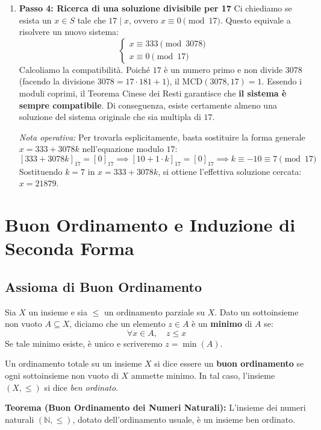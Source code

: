 \documentclass[12pt, a4paper]{article}
\begin{document}
\begin{enumerate}
    \item \textbf{Passo 4: Ricerca di una soluzione divisibile per 17}
    Ci chiediamo se esista un $x \in S$ tale che $17 \mid x$, ovvero $x \equiv 0 \pmod{17}$.
    Questo equivale a risolvere un nuovo sistema:
    \[
    \begin{cases}
        x \equiv 333 \pmod{3078} \\
        x \equiv 0 \pmod{17}
    \end{cases}
    \]
    Calcoliamo la compatibilità. Poiché $17$ è un numero primo e non divide $3078$ (facendo la divisione $3078 = 17 \cdot 181 + 1$), il $\text{MCD}(3078, 17) = 1$.
    Essendo i moduli coprimi, il Teorema Cinese dei Resti garantisce che \textbf{il sistema è sempre compatibile}. Di conseguenza, esiste certamente almeno una soluzione del sistema originale che sia multipla di $17$.
    
    \emph{Nota operativa:} Per trovarla esplicitamente, basta sostituire la forma generale $x = 333 + 3078k$ nell'equazione modulo $17$:
    \[ [333 + 3078k]_{17} = [0]_{17} \implies [10 + 1 \cdot k]_{17} = [0]_{17} \implies k \equiv -10 \equiv 7 \pmod{17} \]
    Sostituendo $k=7$ in $x = 333 + 3078k$, si ottiene l'effettiva soluzione cercata: $x = 21879$.
\end{enumerate}

\section{Buon Ordinamento e Induzione di Seconda Forma}

\subsection{Assioma di Buon Ordinamento}
Sia $X$ un insieme e sia $\le$ un ordinamento parziale su $X$. Dato un sottoinsieme non vuoto $A \subseteq X$, diciamo che un elemento $z \in A$ è un \textbf{minimo} di $A$ se:
\[ \forall x \in A, \quad z \le x \]
Se tale minimo esiste, è unico e scriveremo $z = \min(A)$.

Un ordinamento totale su un insieme $X$ si dice essere un \textbf{buon ordinamento} se ogni sottoinsieme non vuoto di $X$ ammette minimo. In tal caso, l'insieme $(X, \le)$ si dice \emph{ben ordinato}.

\textbf{Teorema (Buon Ordinamento dei Numeri Naturali):}
L'insieme dei numeri naturali $(\mathbb{N}, \le)$, dotato dell'ordinamento usuale, è un insieme ben ordinato.
\end{document}
